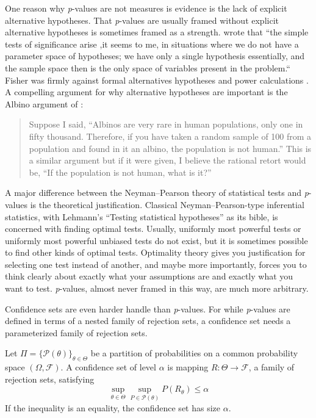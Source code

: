 One reason why \emph{p}-values are not measures is evidence is the lack of explicit alternative hypotheses. That \emph{p}-values are usually framed without explicit alternative hypotheses is sometimes framed as a strength. \textcite[p. 308]{Barnard1962-rz} wrote that ``the simple tests of significance arise ,it seems to me, in situations where we do not have a parameter space of hypotheses; we have only a single hypothesis essentially, and the sample space then is the only space of variables present in the problem.`` Fisher was firmly against formal alternatives hypotheses and power calculations \parencite{Lehmann1993-oa}. A compelling argument for why alternative hypotheses are important is the Albino argument of \textcite{Berkson1942-hj}:
\begin{quotation}
Suppose I said, \textquotedblleft Albinos are very rare in human populations, only one in fifty thousand. Therefore, if you have taken a random sample of 100 from a population and found in it an albino, the population is not human.\textquotedblright{} This is a similar argument but if it were given, I believe the rational retort would be, \textquotedblleft If the population is not human, what is it?\textquotedblright{} 
\end{quotation}
A major difference between the Neyman--Pearson theory of statistical
tests and \textit{p}-values is the theoretical justification. Classical Neyman--Pearson-type
inferential statistics, with Lehmann's ``Testing statistical
hypotheses'' \parencite{Lehmann2005-sp} as its bible, is concerned with
finding optimal tests. Usually, uniformly most powerful tests or uniformly
most powerful unbiased tests do not exist, but it is sometimes possible
to find other kinds of optimal tests. Optimality theory gives you
justification for selecting one test instead of another, and maybe
more importantly, forces you to think clearly about exactly what your
assumptions are and exactly what you want to test. \emph{p}-values,
almost never framed in this way, are much more arbitrary. 

Confidence sets are even harder handle than \emph{p}-values. For while
\emph{p}-values are defined in terms of a nested family of rejection
sets, a confidence set needs a parameterized family of rejection sets.
\begin{definition}
\label{def:confidence sets}Let $\Pi=\{\mathcal{P}(\theta)\}_{\theta\in\Theta}$
be a partition of probabilities on a common probability space $(\Omega,\mathcal{F})$.
A confidence set of level $\alpha$ is mapping $R:\Theta\to\mathcal{F}$,
a family of rejection sets, satisfying 
\begin{equation}
\sup_{\theta\in\Theta}\sup_{P\in\mathcal{P}(\theta)}P(R_{\theta})\leq\alpha\label{eq:confidence set}
\end{equation}
If the inequality is an equality, the confidence set has size $\alpha$. 
\end{definition}

